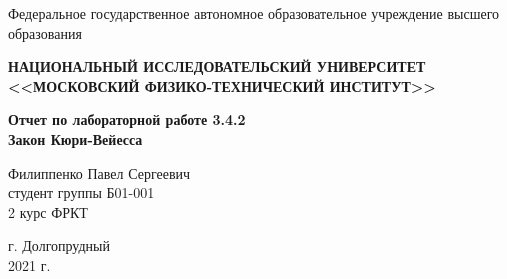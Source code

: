 \begin{center}
    
    \normalsize{Федеральное государственное автономное образовательное учреждение высшего образования}
    
    \textbf{НАЦИОНАЛЬНЫЙ ИССЛЕДОВАТЕЛЬСКИЙ УНИВЕРСИТЕТ \\ <<МОСКОВСКИЙ ФИЗИКО-ТЕХНИЧЕСКИЙ ИНСТИТУТ>>}
    \vspace{13ex}
    
    \textbf{Отчет по лабораторной работе 3.4.2 \\Закон Кюри-Вейесса}
    \vspace{40ex}
    
    \normalsize{Филиппенко Павел Сергеевич \\ студент группы Б01-001\\ 2 курс ФРКТ\\}
\end{center}
    
\vfill 
    
\begin{center}
г. Долгопрудный\\ 
2021 г.
\end{center}


\thispagestyle{empty} %
\newpage